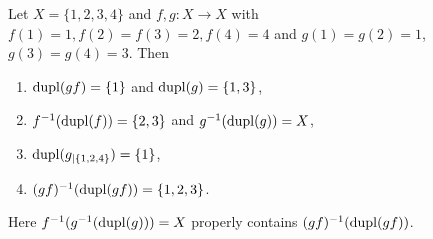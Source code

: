 \begin{example} \label{prelim:func:ex:inv-dupl}
	Let $X = \{1,2,3,4\}$ and $f,g \colon X \to X$ with $f(1) = 1, f(2) = f(3) = 2, f(4) = 4$
	and $g(1) = g(2) = 1$, $g(3) = g(4) = 3$.
	Then
	\begin{enumerate}
		
		\item $\dupl{\concat{f}{g}} = \{1\}$ and $\dupl{g} = \{1,3\}$,
		
		\item $f^{-1}(\dupl{f}) = \{2,3\}$ and $g^{-1}(\dupl{g}) = X$,
		
		\item $\dupl{g_{|\{1,2,4\}}} = \{ 1 \}$,
		
		\item $(gf)^{-1}( \dupl{\concat{f}{g}} ) = \{1,2,3\}$.
		
	\end{enumerate}
	Here $f^{-1}(g^{-1}(\dupl{g})) = X$
	properly contains $(gf)^{-1}( \dupl{\concat{f}{g}} )$.
\end{example}

